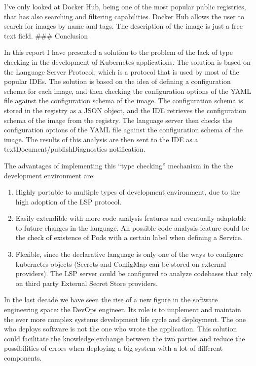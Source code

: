 \documentclass[
  11pt,
]{article}
\begin{document}
I've only looked at Docker Hub, being one of the most popular public
registries, that has also searching and filtering capabilities. Docker
Hub allows the user to search for images by name and tags. The
description of the image is just a free text field. \#\#\# Conclusion

In this report I have presented a solution to the problem of the lack of
type checking in the development of Kubernetes applications. The
solution is based on the Language Server Protocol, which is a protocol
that is used by most of the popular IDEs. The solution is based on the
idea of defining a configuration schema for each image, and then
checking the configuration options of the YAML file against the
configuration schema of the image. The configuration schema is stored in
the registry as a JSON object, and the IDE retrieves the configuration
schema of the image from the registry. The language server then checks
the configuration options of the YAML file against the configuration
schema of the image. The results of this analysis are then sent to the
IDE as a textDocument/publishDiagnostics notification.

The advantages of implementing this ``type checking'' mechanism in the
the development environment are:

\begin{enumerate}
\def\labelenumi{\arabic{enumi}.}
\item
  Highly portable to multiple types of development environment, due to
  the high adoption of the LSP protocol.
\item
  Easily extendible with more code analysis features and eventually
  adaptable to future changes in the language. An possible code analysis
  feature could be the check of existence of Pods with a certain label
  when defining a Service.
\item
  Flexible, since the declarative language is only one of the ways to
  configure kubernetes objects (Secrets and ConfigMap can be stored on
  external providers). The LSP server could be configured to analyze
  codebases that rely on third party External Secret Store providers.
\end{enumerate}

In the last decade we have seen the rise of a new figure in the software
engineering space: the DevOps engineer. Its role is to implement and
maintain the ever more complex systems development life cycle and
deployment. The one who deploys software is not the one who wrote the
application. This solution could facilitate the knowledge exchange
between the two parties and reduce the possibilities of errors when
deploying a big system with a lot of different components.
\end{document}

